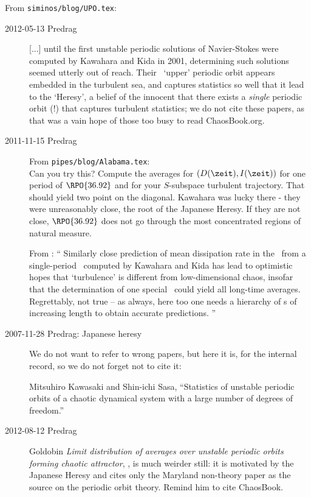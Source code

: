 From \texttt{siminos/blog/UPO.tex}:
\begin{description}
\item[2012-05-13  Predrag] [...] until the first unstable periodic solutions of
Navier-Stokes were computed by Kawahara and Kida in 2001,
determining such solutions seemed utterly out of reach. Their \pCf\
`upper' periodic orbit appears embedded in the turbulent sea, and
captures statistics so well that it lead to the `Heresy', a belief of the
innocent that there exists a \emph{single} periodic orbit (!) that
captures turbulent statistics; we do not cite these papers, as
that was a vain hope of those too busy to read ChaosBook.org.

\item[2011-11-15  Predrag] From \texttt{pipes/blog/Alabama.tex}:
\\
Can you try this?
Compute the averages for $(D(\zeit),I(\zeit))$ for one period of
$\RPO{36.92}$ and for your $S$-subspace turbulent trajectory. That should
yield two point on the diagonal.  Kawahara was lucky there - they were
unreasonably close, the root of the Japanese Heresy. If they are not close,
$\RPO{36.92}$ does not go through the most concentrated regions of natural
measure.

From : ``
Similarly close prediction of mean dissipation rate in the
\pCf\ from a single-period \po\ computed by
Kawahara and Kida has lead to
optimistic hopes that `turbulence' is different from
low-dimensional chaos, insofar that the determination of one special
\po\ could yield all long-time averages.
Regrettably, not true -- as always, here too one needs a hierarchy
of \po s of increasing length to obtain accurate
predictions.
    ''


\item[2007-11-28 Predrag: Japanese heresy]
We do not want to refer to wrong papers, but here it is, for
the internal record, so we do not forget not to cite it:

Mitsuhiro Kawasaki and Shin-ichi Sasa,
    ``Statistics of unstable periodic orbits of a chaotic dynamical system
    with a large number of degrees of freedom.''

\item[2012-08-12  Predrag]
Goldobin \emph{Limit distribution of averages over
unstable periodic orbits forming chaotic attractor}, ,
is much weirder still: it is motivated by the Japanese Heresy and cites
only the Maryland non-theory paper as the source on the periodic orbit
theory.  Remind him to cite ChaosBook.

\end{description}

